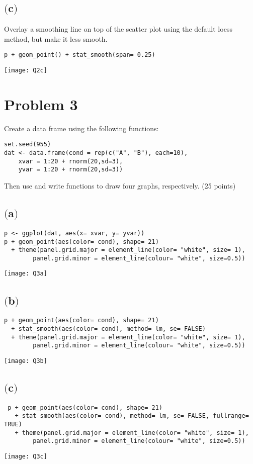 \documentclass[a4paper,man,natbib]{apa6}
\begin{document}
\subsection{$($c$)$}
Overlay a smoothing line on top of the scatter plot using the default loess method, but make it less smooth. \\
\begin{verbatim}
p + geom_point() + stat_smooth(span= 0.25)
\end{verbatim}
\texttt{[image: Q2c]}

\pagebreak
\section{Problem 3}
Create a data frame using the following functions: \\
\begin{verbatim}
set.seed(955)
dat <- data.frame(cond = rep(c("A", "B"), each=10),
	xvar = 1:20 + rnorm(20,sd=3),
	yvar = 1:20 + rnorm(20,sd=3))
\end{verbatim}
Then use and write functions to draw four graphs, respectively. (25 points) \\

\subsection{$($a$)$}
\begin{verbatim}
p <- ggplot(dat, aes(x= xvar, y= yvar))
p + geom_point(aes(color= cond), shape= 21) 
  + theme(panel.grid.major = element_line(color= "white", size= 1), 
	  	panel.grid.minor = element_line(colour= "white", size=0.5))
\end{verbatim}
\texttt{[image: Q3a]}

\subsection{$($b$)$}
\begin{verbatim}
p + geom_point(aes(color= cond), shape= 21) 
  + stat_smooth(aes(color= cond), method= lm, se= FALSE) 
  + theme(panel.grid.major = element_line(color= "white", size= 1), 
  		panel.grid.minor = element_line(colour= "white", size=0.5))
\end{verbatim}
\texttt{[image: Q3b]}

\subsection{$($c$)$}
\begin{verbatim}
 p + geom_point(aes(color= cond), shape= 21) 
   + stat_smooth(aes(color= cond), method= lm, se= FALSE, fullrange= TRUE) 
   + theme(panel.grid.major = element_line(color= "white", size= 1), 
   		panel.grid.minor = element_line(colour= "white", size=0.5)) 
\end{verbatim}
\texttt{[image: Q3c]}
\end{document}
